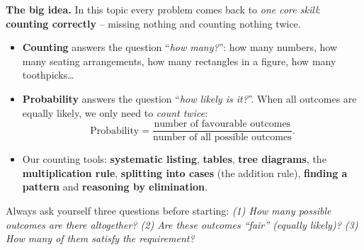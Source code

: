 \providecommand{\cpSpinSix}[6]{%
  \foreach \a in {90,150,210,270,330,30}{\draw[Ink,line width=0.8pt] (0,0)--(\a:1.1);}
  \draw[Ink,line width=1pt] (0,0) circle (1.1);
  \node[font=\itshape\large] at (120:0.72){#1};
  \node[font=\itshape\large] at (60:0.72){#2};
  \node[font=\itshape\large] at (0:0.72){#3};
  \node[font=\itshape\large] at (-60:0.72){#4};
  \node[font=\itshape\large] at (-120:0.72){#5};
  \node[font=\itshape\large] at (180:0.72){#6};
  \draw[-{Stealth[length=7pt]},line width=1.6pt,Ink] (0,0)--(250:0.98);
  \fill[Ink] (0,0) circle (1.6pt);}
\providecommand{\cpOct}[2]{%
  \draw[Ink,line width=0.8pt,fill=tmBlue!8] (#1-0.2071,#2+0.5)--(#1+0.2071,#2+0.5)--(#1+0.5,#2+0.2071)--(#1+0.5,#2-0.2071)
     --(#1+0.2071,#2-0.5)--(#1-0.2071,#2-0.5)--(#1-0.5,#2-0.2071)--(#1-0.5,#2+0.2071)--cycle;}
\providecommand{\cpDia}[2]{%
  \draw[Ink,line width=0.8pt,fill=tmOrange!35] (#1,#2+0.2929)--(#1+0.2929,#2)--(#1,#2-0.2929)--(#1-0.2929,#2)--cycle;}
\providecommand{\rvcaBall}[3]{\filldraw[fill=#3!55,draw=#3!75!black,line width=0.7pt] (#1,#2) circle (0.22);}


\begin{knowbox}
\textbf{The big idea.} In this topic every problem comes back to \emph{one core skill}: \textbf{counting correctly} -- missing nothing and counting nothing twice.
\begin{itemize}[leftmargin=1.2em,itemsep=1pt,topsep=2pt]
\item \textbf{Counting} answers the question ``\emph{how many?}'': how many numbers, how many seating arrangements, how many rectangles in a figure, how many toothpicks\ldots
\item \textbf{Probability} answers the question ``\emph{how likely is it?}''. When all outcomes are equally likely, we only need to \emph{count twice}:
\[
\text{Probability}=\frac{\text{number of favourable outcomes}}{\text{number of all possible outcomes}} .
\]
\item Our counting tools: \textbf{systematic listing}, \textbf{tables}, \textbf{tree diagrams}, the \textbf{multiplication rule}, \textbf{splitting into cases} (the addition rule), \textbf{finding a pattern} and \textbf{reasoning by elimination}.
\end{itemize}
Always ask yourself three questions before starting: \emph{(1) How many possible outcomes are there altogether? (2) Are these outcomes ``fair'' (equally likely)? (3) How many of them satisfy the requirement?}
\end{knowbox}

